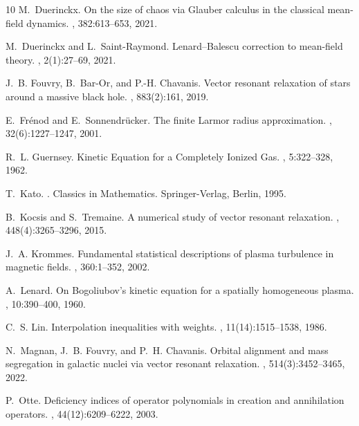\documentclass[a4paper,11pt,reqno,noindent]{amsart}
\theoremstyle{plain}
\numberwithin{equation}{section}
\newcommand{\3}{|\!|\!|}
\begin{document}
\begin{thebibliography}{10}
M.~Duerinckx.
\newblock On the size of chaos via {G}lauber calculus in the classical
  mean-field dynamics.
, 382:613--653, 2021.

M.~Duerinckx and L.~Saint-Raymond.
\newblock Lenard--{B}alescu correction to mean-field theory.
, 2(1):27--69, 2021.

J.~B. Fouvry, B.~Bar-Or, and P.-H. Chavanis.
\newblock Vector resonant relaxation of stars around a massive black hole.
, 883(2):161, 2019.

E.~Fr\'enod and E.~Sonnendr\"ucker.
\newblock The finite {L}armor radius approximation.
, 32(6):1227--1247, 2001.

R.~L. Guernsey.
\newblock Kinetic {E}quation for a {C}ompletely {I}onized {G}as.
, 5:322--328, 1962.

T.~Kato.
.
\newblock Classics in Mathematics. Springer-Verlag, Berlin, 1995.

B.~Kocsis and S.~Tremaine.
\newblock A numerical study of vector resonant relaxation.
, 448(4):3265--3296, 2015.

J.~A. Krommes.
\newblock Fundamental statistical descriptions of plasma turbulence in magnetic
  fields.
, 360:1--352, 2002.

A.~Lenard.
\newblock On {B}ogoliubov's kinetic equation for a spatially homogeneous
  plasma.
, 10:390--400, 1960.

C.~S. Lin.
\newblock Interpolation inequalities with weights.
, 11(14):1515--1538, 1986.

N.~Magnan, J.~B. Fouvry, and P.~H. Chavanis.
\newblock Orbital alignment and mass segregation in galactic nuclei via vector
  resonant relaxation.
, 514(3):3452--3465, 2022.

P.~Otte.
\newblock Deficiency indices of operator polynomials in creation and
  annihilation operators.
, 44(12):6209--6222, 2003.


\end{thebibliography}
\end{document}
